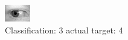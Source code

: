 \begin{figure}[h!]
\begin{center}
\includegraphics[width=0.60\columnwidth]{figures/ID709_class_3_target_4.png}
\end{center}
\caption{ Classification: 3 actual target: 4}
\label{fig:ID709_class_3_target_4}
\end{figure}
